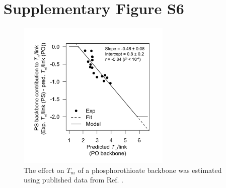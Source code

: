 \documentclass[a4paper,11pt]{article}
\newenvironment{Ncenter}{%
  \setlength\topsep{-10pt}
  \setlength\parskip{-100pt}
  \begin{center}
}{%
  \end{center}
}
\begin{document}
\section{Supplementary Figure S6}
\begin{figure}[!h]
\begin{Ncenter}
\includegraphics[width=0.65\textwidth]{SuppFig_PS.pdf}
\end{Ncenter}
\caption{The effect on $T_m$ of a phosphorothioate backbone was estimated using published data from Ref. \cite{Hashem:1998kf}.}\label{fig:figPS}
\end{figure}


\end{document}
